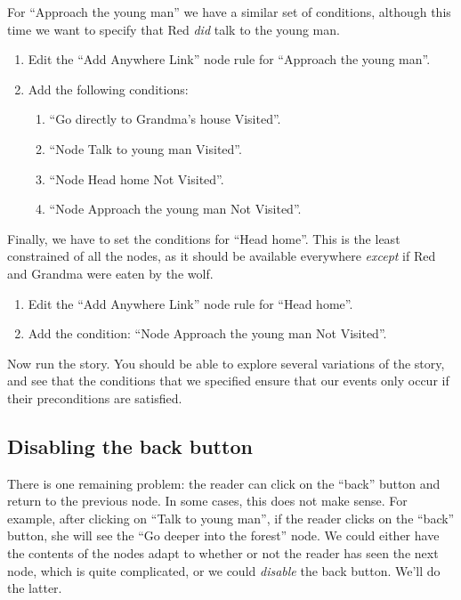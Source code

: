 \documentclass{article}
\begin{document}
For ``Approach the young man'' we have a similar set of conditions, although
this time we want to specify that Red \textit{did} talk to the young man.

\begin{enumerate}
  \item Edit the ``Add Anywhere Link'' node rule for ``Approach the young man''.
  \item Add the following conditions:
  \begin{enumerate}
  \item ``Go directly to Grandma's house
  Visited''.
  \item ``Node Talk to young man Visited''.
  \item ``Node Head home Not Visited''.
  \item ``Node Approach the young man Not Visited''.
\end{enumerate}
\end{enumerate}

Finally, we have to set the conditions for ``Head home''. This is the least
constrained of all the nodes, as it should be available everywhere
\textit{except} if Red and Grandma were eaten by the wolf.

\begin{enumerate}
  \item Edit the ``Add Anywhere Link'' node rule for ``Head home''.
  \item Add the condition: ``Node Approach the young man Not Visited''.
\end{enumerate}

Now run the story. You should be able to explore several variations of the
story, and see that the conditions that we specified ensure that our events
only occur if their preconditions are satisfied.

\subsection{Disabling the back button}

There is one remaining problem: the reader can click on the ``back'' button and
return to the previous node. In some cases, this does not make sense. For
example, after clicking on ``Talk to young man'', if the reader clicks on the
``back'' button, she will see the ``Go deeper into the forest'' node. We could
either have the contents of the nodes adapt to whether or not the reader has
seen the next node, which is quite complicated, or we could \textit{disable}
the back button. We'll do the latter.
\end{document}
